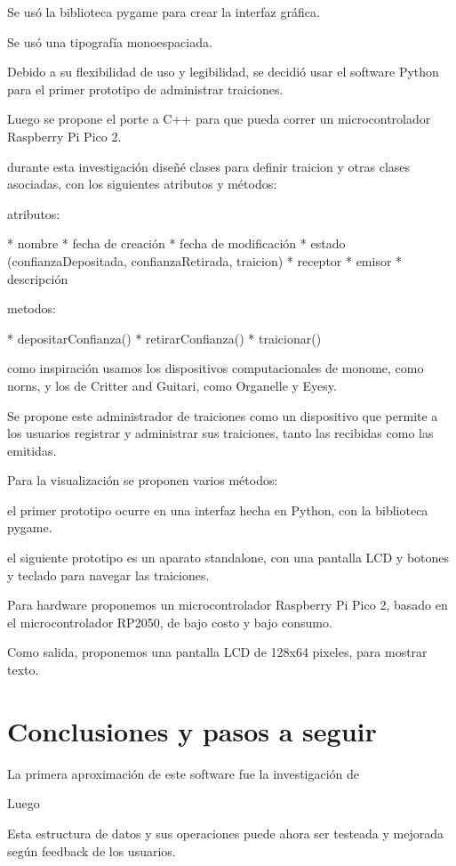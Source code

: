 \documentclass{article}
\begin{document}
Se usó la biblioteca pygame para crear la interfaz gráfica.

Se usó una tipografía monoespaciada.

Debido a su flexibilidad de uso y legibilidad, se decidió usar el software Python para el primer prototipo de administrar traiciones.

Luego se propone el porte a C++ para que pueda correr un microcontrolador Raspberry Pi Pico 2.

durante esta investigación diseñé clases para definir traicion y otras clases asociadas, con los siguientes atributos y métodos:

atributos:

* nombre
* fecha de creación
* fecha de modificación
* estado (confianzaDepositada, confianzaRetirada, traicion)
* receptor
* emisor
* descripción

metodos:

* depositarConfianza()
* retirarConfianza()
* traicionar()

como inspiración usamos los dispositivos computacionales de monome, como norns, y los de Critter and Guitari, como Organelle y Eyesy.

Se propone este administrador de traiciones como un dispositivo que permite a los usuarios registrar y administrar sus traiciones, tanto las recibidas como las emitidas.

Para la visualización se proponen varios métodos:

el primer prototipo ocurre en una interfaz hecha en Python, con la biblioteca pygame.

el siguiente prototipo es un aparato standalone, con una pantalla LCD y botones y teclado para navegar las traiciones.

Para hardware proponemos un microcontrolador Raspberry Pi Pico 2, basado en el microcontrolador RP2050, de bajo costo y bajo consumo.

Como salida, proponemos una pantalla LCD de 128x64 pixeles, para mostrar texto.

\clearpage

\section{Conclusiones y pasos a seguir}


La primera aproximación de este software fue la investigación de

Luego

Esta estructura de datos y sus operaciones puede ahora ser testeada y mejorada según feedback de los usuarios.
\end{document}
